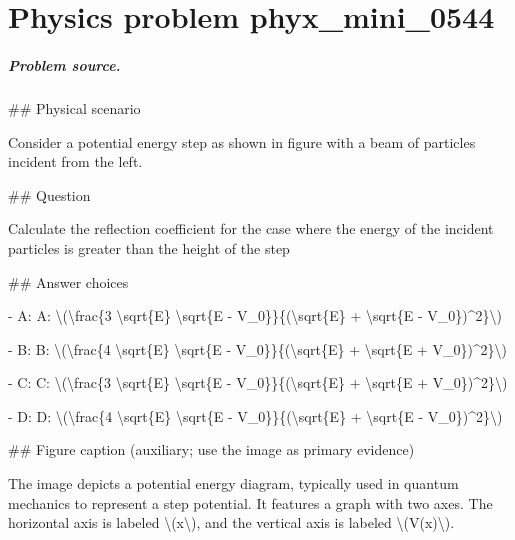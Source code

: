 
\chapter{Physics problem phyx\_mini\_0544}
\label{ch:PhyXMiniProblems_problem_phyx_mini_0544}

\paragraph{Problem source.}
\#\# Physical scenario

Consider a potential energy step as shown in figure with a beam of particles incident from the left.

\#\# Question

Calculate the reflection coefficient for the case where the energy of the incident particles is greater than the height of the step

\#\# Answer choices

- A: A: \textbackslash{}(\textbackslash{}frac\{3 \textbackslash{}sqrt\{E\} \textbackslash{}sqrt\{E - V\_0\}\}\{(\textbackslash{}sqrt\{E\} + \textbackslash{}sqrt\{E - V\_0\})\textasciicircum{}2\}\textbackslash{})

- B: B: \textbackslash{}(\textbackslash{}frac\{4 \textbackslash{}sqrt\{E\} \textbackslash{}sqrt\{E - V\_0\}\}\{(\textbackslash{}sqrt\{E\} + \textbackslash{}sqrt\{E + V\_0\})\textasciicircum{}2\}\textbackslash{})

- C: C: \textbackslash{}(\textbackslash{}frac\{3 \textbackslash{}sqrt\{E\} \textbackslash{}sqrt\{E - V\_0\}\}\{(\textbackslash{}sqrt\{E\} + \textbackslash{}sqrt\{E + V\_0\})\textasciicircum{}2\}\textbackslash{})

- D: D: \textbackslash{}(\textbackslash{}frac\{4 \textbackslash{}sqrt\{E\} \textbackslash{}sqrt\{E - V\_0\}\}\{(\textbackslash{}sqrt\{E\} + \textbackslash{}sqrt\{E - V\_0\})\textasciicircum{}2\}\textbackslash{})

\#\# Figure caption (auxiliary; use the image as primary evidence)

The image depicts a potential energy diagram, typically used in quantum mechanics to represent a step potential. It features a graph with two axes. The horizontal axis is labeled \textbackslash{}(x\textbackslash{}), and the vertical axis is labeled \textbackslash{}(V(x)\textbackslash{}).


